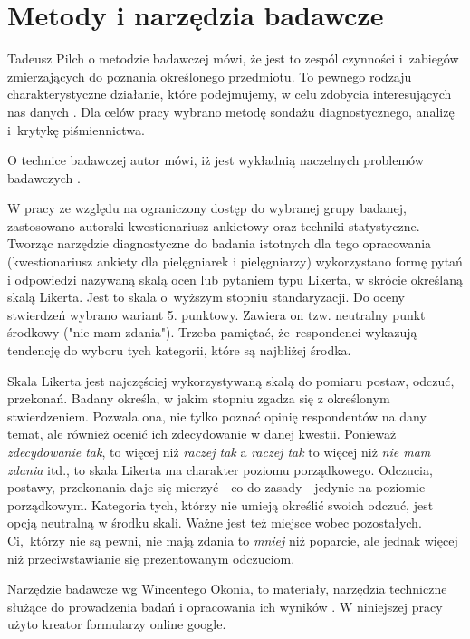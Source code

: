 \documentclass[a4paper,12pt,twoside,openright]{mwrep}
\begin{document}
\section{Metody i narzędzia badawcze}
Tadeusz Pilch o metodzie badawczej mówi, że jest to zespól czynności i~zabiegów zmierzających do poznania określonego przedmiotu. To pewnego rodzaju charakterystyczne działanie, które podejmujemy, w celu zdobycia interesujących nas danych \cite{tadeusz}. Dla celów pracy wybrano metodę sondażu diagnostycznego, analizę i~krytykę piśmiennictwa.\cite{krys}

O technice badawczej autor mówi, iż jest wykładnią naczelnych problemów badawczych \cite{tadeusz}. 

W pracy ze względu na ograniczony dostęp do wybranej grupy badanej, zastosowano autorski kwestionariusz ankietowy oraz techniki statystyczne.
Tworząc narzędzie diagnostyczne do badania istotnych dla tego opracowania (kwestionariusz ankiety dla pielęgniarek i pielęgniarzy) wykorzystano formę pytań i odpowiedzi nazywaną skalą ocen lub pytaniem typu Likerta, w skrócie określaną skalą Likerta. Jest to skala o~wyższym stopniu standaryzacji. Do oceny stwierdzeń wybrano wariant 5. punktowy. Zawiera on tzw. neutralny punkt środkowy ("nie mam zdania"). Trzeba pamiętać, że~respondenci wykazują tendencję do wyboru tych kategorii, które są najbliżej środka.

Skala Likerta jest najczęściej wykorzystywaną skalą do pomiaru postaw, odczuć, przekonań. Badany określa, w jakim stopniu zgadza się z określonym stwierdzeniem. Pozwala ona, nie tylko poznać opinię respondentów na dany temat, ale również ocenić ich zdecydowanie w danej kwestii. Ponieważ \textit{zdecydowanie tak}, to więcej niż \textit{raczej tak} a \textit{raczej tak} to więcej niż \textit{nie mam zdania} itd., to skala Likerta ma charakter poziomu porządkowego. Odczucia, postawy, przekonania daje się mierzyć - co do zasady - jedynie na poziomie porządkowym. Kategoria tych, którzy nie umieją określić swoich odczuć, jest opcją neutralną w środku skali. Ważne jest też miejsce wobec pozostałych. Ci,~którzy nie są pewni, nie mają zdania to \textit{mniej} niż poparcie, ale jednak więcej niż przeciwstawianie się prezentowanym odczuciom.

Narzędzie badawcze wg Wincentego Okonia, to materiały, narzędzia techniczne służące do prowadzenia badań i opracowania ich wyników \cite{winc}. W niniejszej pracy użyto kreator formularzy online google.
\end{document}
